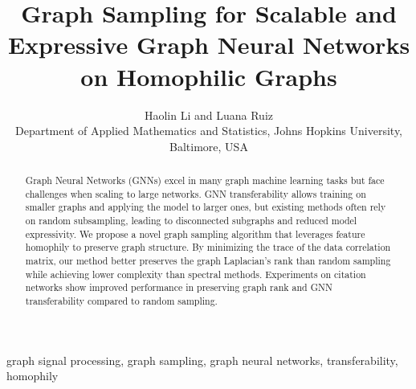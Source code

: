 \documentclass[conference]{IEEEtran}
\title{Graph Sampling for Scalable and Expressive Graph Neural Networks on Homophilic Graphs}
\author{Haolin Li and Luana Ruiz\\
Department of Applied Mathematics and Statistics, Johns Hopkins University, Baltimore, USA}
\theoremstyle{definition}
\begin{document}
%
\maketitle
%
\begin{abstract}
Graph Neural Networks (GNNs) excel in many graph machine learning tasks but face challenges when scaling to large networks. GNN transferability allows training on smaller graphs and applying the model to larger ones, but existing methods often rely on random subsampling, leading to disconnected subgraphs and reduced model expressivity.
We propose a novel graph sampling algorithm that leverages feature homophily to preserve graph structure. By minimizing the trace of the data correlation matrix, our method better preserves the graph Laplacian’s rank than random sampling while achieving lower complexity than spectral methods. Experiments on citation networks show improved performance in preserving graph rank and GNN transferability compared to random sampling.

\end{abstract}
%
\begin{IEEEkeywords}
graph signal processing, graph sampling, graph neural networks, transferability, homophily
\end{IEEEkeywords}
%











\vfill\pagebreak



\end{document}

